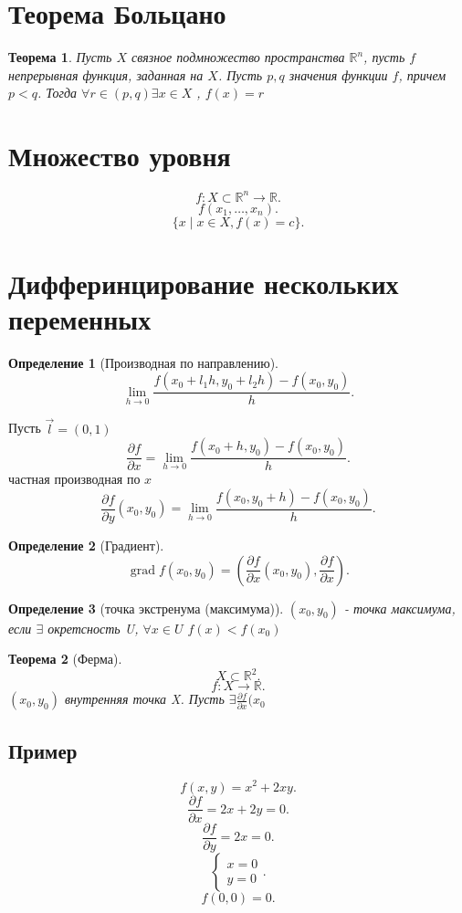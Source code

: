 \documentclass[14pt]{extarticle} \usepackage{fontspec}
\newtheorem{theorem}{Теорема}
\newtheorem{definition}{Определение}
\DeclareMathOperator{\grad}{grad}
\begin{document}
\section{Теорема Больцано}
\begin{theorem}
    Пусть $X$ связное подмножество пространства  $\mathbb{R}^{n}$,
    пусть $f$ непрерывная функция, заданная на  $X$. Пусть  $p,q$ значения функции  $f$, причем  $p < q$. Тогда  $\forall  r \in (p,q) \exists x \in X$ , $f(x) = r$
\end{theorem}
\section{Множество уровня}
\[
f: X \subset \mathbb{R}^{n} \to \mathbb{R}
.\] 
\[
f(x_1,\dots,x_{n})
.\] 
\[
    \{x \mid x \in X, f(x) = c\}
.\] 
\section{Дифферинцирование нескольких переменных}
\begin{definition}[Производная по направлению]
    \[
    \lim_{h \to 0} \frac{f(x_0 + l_1 h, y_0 + l_2 h) - f(x_0,y_0)}{h}
    .\] 
\end{definition}
Пусть $\vec{l} = (0,1)$
\[
\frac{\partial f}{\partial x}=
\lim_{h \to 0} \frac{f(x_0 + h,y_0) - f(x_0,y_0)}{h}
.\] 
частная производная по $x$
\[
\frac{\partial f}{\partial y} (x_0,y_0) = 
\lim_{h \to 0} \frac{f(x_0,y_0  + h) - f(x_0,y_0)}{h}
.\] 
\begin{definition}[Градиент]
    \[
    \grad f (x_0,y_0) = (\frac{\partial f}{\partial x} (x_0,y_0),\frac{\partial f}{\partial x})
    .\] 
\end{definition}
\begin{definition}[точка экстренума (максимума)]
    $(x_0,y_0)$ - точка максимума, если $\exists$ окретсность U, $\forall x  \in U$  $f(x) < f(x_0)$
\end{definition}
\begin{theorem}[Ферма]
    \[
    X \subset \mathbb{R}^{2}
    .\] 
    \[
    f : X \to \mathbb{R}
    .\] 
    $(x_0,y_0)$ внутренняя точка X. Пусть $\exists  \frac{\partial f}{\partial x} (x_0$
\end{theorem}
\subsection{Пример}
\[
f(x,y) = x^2 + 2xy
.\] 
\[
\frac{\partial f}{\partial x} = 2x + 2y = 0
.\] 
\[
\frac{\partial f}{\partial y} = 2x = 0
.\] 
\[
\begin{cases}
    x = 0\\
    y = 0
\end{cases}
.\] 
\[
f(0,0) = 0
.\] 
\end{document}
